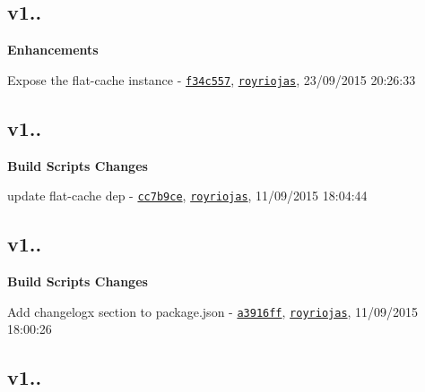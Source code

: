 \subsection*{v1..}


\begin{DoxyItemize}
\item {\bfseries Enhancements}
\begin{DoxyItemize}
\item Expose the flat-\/cache instance -\/ \href{https://github.com/royriojas/file-entry-cache/commit/f34c557}{\tt f34c557}, \href{https://github.com/royriojas}{\tt royriojas}, 23/09/2015 20\+:26\+:33
\end{DoxyItemize}
\end{DoxyItemize}

\subsection*{v1..}


\begin{DoxyItemize}
\item {\bfseries Build Scripts Changes}
\begin{DoxyItemize}
\item update flat-\/cache dep -\/ \href{https://github.com/royriojas/file-entry-cache/commit/cc7b9ce}{\tt cc7b9ce}, \href{https://github.com/royriojas}{\tt royriojas}, 11/09/2015 18\+:04\+:44
\end{DoxyItemize}
\end{DoxyItemize}

\subsection*{v1..}


\begin{DoxyItemize}
\item {\bfseries Build Scripts Changes}
\begin{DoxyItemize}
\item Add changelogx section to package.\+json -\/ \href{https://github.com/royriojas/file-entry-cache/commit/a3916ff}{\tt a3916ff}, \href{https://github.com/royriojas}{\tt royriojas}, 11/09/2015 18\+:00\+:26
\end{DoxyItemize}
\end{DoxyItemize}

\subsection*{v1..}


